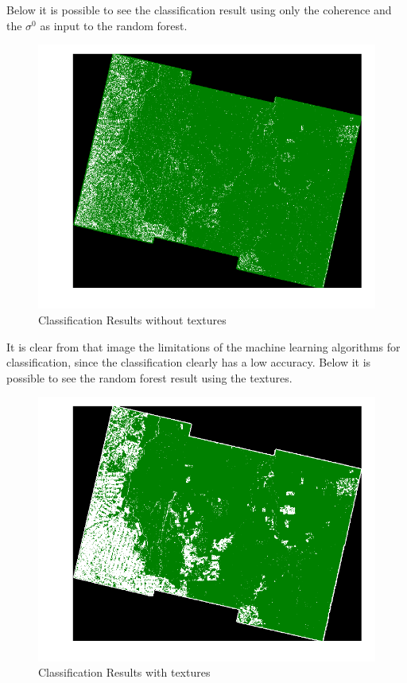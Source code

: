 Below it is possible to see the classification result using only the coherence and the $\sigma^0$ as input to the random forest.
\begin{figure}[H]
    \centering
    \includegraphics[width=\linewidth]{Chapter5/TANDEM-X/result_no_texturesimage.pdf}
    \caption{Classification Results without textures}
    \label{fig:result_no_textures_sentinel}
\end{figure}{}
It is clear from that image the limitations of the machine learning algorithms for classification, since the classification clearly has a low accuracy. Below it is possible to see the random forest result using the textures.

\begin{figure}[H]
    \centering
    \includegraphics[width=\linewidth]{Chapter5/TANDEM-X/result_texturesimage.pdf}
    \caption{Classification Results with textures}
    \label{fig:result_textures_sentinel}
\end{figure}{}

